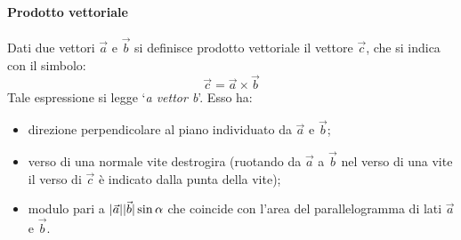 \documentclass[10pt,a4paper]{book}
\DeclarePairedDelimiter{\abs}{\lvert}{\rvert} %
\begin{document}
\paragraph{Prodotto vettoriale} Dati due vettori $\vec{a}$ e $\vec{b}$ si definisce prodotto vettoriale il vettore $\vec{c}$, che si indica con il simbolo:
\[
	\vec{c}=\vec{a} \times \vec{b}
\]
Tale espressione si legge `\textit{a vettor b}'. Esso ha:
\begin{itemize}
	\item direzione perpendicolare al piano individuato da $\vec{a}$ e $\vec{b}$;
	\item verso di una normale vite destrogira (ruotando da $\vec{a}$ a $\vec{b}$ nel verso di una vite il verso di $\vec{c}$ è indicato dalla punta della vite);
	\item modulo pari a $\abs{\vec{a}}\abs{\vec{b}}\sin\alpha$ che coincide con l'area del parallelogramma di lati $\vec{a}$ e $\vec{b}$.
\end{itemize}
\end{document}
